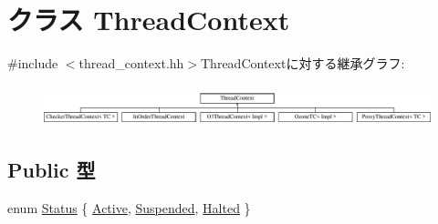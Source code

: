 \hypertarget{classThreadContext}{
\section{クラス ThreadContext}
\label{classThreadContext}
}


{\ttfamily \#include $<$thread\_\-context.hh$>$}ThreadContextに対する継承グラフ:\begin{figure}[H]
\begin{center}
\leavevmode
\includegraphics[height=1.17895cm]{classThreadContext}
\end{center}
\end{figure}
\subsection*{Public 型}
\begin{DoxyCompactItemize}
\item 
enum \hyperlink{classThreadContext_a67a0db04d321a74b7e7fcfd3f1a3f70b}{Status} \{ \hyperlink{classThreadContext_a67a0db04d321a74b7e7fcfd3f1a3f70ba26bd8444261cc58df7a86753c79d2520}{Active}, 
\hyperlink{classThreadContext_a67a0db04d321a74b7e7fcfd3f1a3f70ba13bd6ff4bd5714ccc293f6802aacb40d}{Suspended}, 
\hyperlink{classThreadContext_a67a0db04d321a74b7e7fcfd3f1a3f70ba185a75df63e845aec97632afd6a34d6a}{Halted}
 \}
\end{DoxyCompactItemize}
